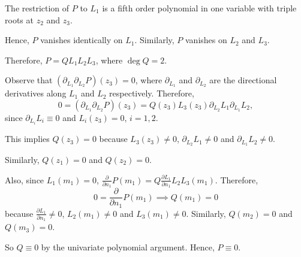 The restriction of $P$ to $L_1$ is a fifth order polynomial in one variable with triple roots at $z_2$ and $z_3$.

Hence, $P$ vanishes identically on $L_1$. Similarly, $P$ vanishes on $L_2$ and $L_3$.

Therefore, $P = Q L_1 L_2 L_3$, where $\deg Q = 2$.

Observe that $(\partial_{L_1} \partial_{L_2} P)(z_3) = 0$, where $\partial_{L_1}$ and $\partial_{L_2}$ are the directional derivatives along $L_1$ and $L_2$ respectively.
Therefore,
\[
    0 = (\partial_{L_1} \partial_{L_2} P)(z_3) = Q(z_3) L_3(z_3) \partial_{L_2} L_1 \partial_{L_1} L_2,
\]
since $\partial_{L_i} L_i \equiv 0$ and $L_i(z_3) = 0$, $i = 1,2$.

This implies $Q(z_3) = 0$ because $L_3(z_3) \neq 0$, $\partial_{L_2} L_1 \neq 0$ and $\partial_{L_1} L_2 \neq 0$.

Similarly, $Q(z_1) = 0$ and $Q(z_2) = 0$.

Also, since $L_1(m_1) = 0$, $\frac{\partial}{\partial n_1} P(m_1) = Q \frac{\partial L_1}{\partial n_1} L_2 L_3 (m_1)$. Therefore,
\[
    0 = \frac{\partial}{\partial n_1} P(m_1) \implies Q(m_1) = 0
\]
because $\frac{\partial L_1}{\partial n_1} \neq 0$, $L_2(m_1) \neq 0$ and $L_3(m_1) \neq 0$. Similarly, $Q(m_2) = 0$ and $Q(m_3) = 0$.

So $Q \equiv 0$ by the univariate polynomial argument. Hence, $P \equiv 0$.


